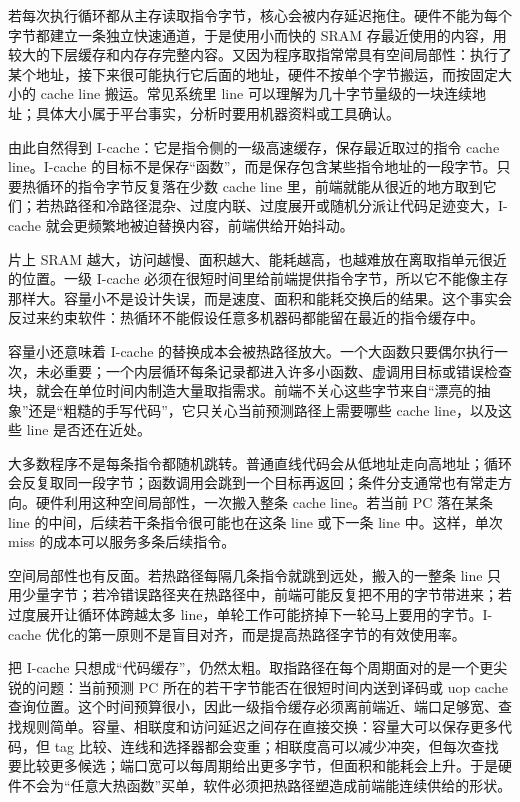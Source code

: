 若每次执行循环都从主存读取指令字节，核心会被内存延迟拖住。硬件不能为每个字节都建立一条独立快速通道，于是使用小而快的 SRAM 存最近使用的内容，用较大的下层缓存和内存存完整内容。又因为程序取指常常具有空间局部性：执行了某个地址，接下来很可能执行它后面的地址，硬件不按单个字节搬运，而按固定大小的 cache line 搬运。常见系统里 line 可以理解为几十字节量级的一块连续地址；具体大小属于平台事实，分析时要用机器资料或工具确认。

由此自然得到 I-cache：它是指令侧的一级高速缓存，保存最近取过的指令 cache line。I-cache 的目标不是保存“函数”，而是保存包含某些指令地址的一段字节。只要热循环的指令字节反复落在少数 cache line 里，前端就能从很近的地方取到它们；若热路径和冷路径混杂、过度内联、过度展开或随机分派让代码足迹变大，I-cache 就会更频繁地被迫替换内容，前端供给开始抖动。

片上 SRAM 越大，访问越慢、面积越大、能耗越高，也越难放在离取指单元很近的位置。一级 I-cache 必须在很短时间里给前端提供指令字节，所以它不能像主存那样大。容量小不是设计失误，而是速度、面积和能耗交换后的结果。这个事实会反过来约束软件：热循环不能假设任意多机器码都能留在最近的指令缓存中。

容量小还意味着 I-cache 的替换成本会被热路径放大。一个大函数只要偶尔执行一次，未必重要；一个内层循环每条记录都进入许多小函数、虚调用目标或错误检查块，就会在单位时间内制造大量取指需求。前端不关心这些字节来自“漂亮的抽象”还是“粗糙的手写代码”，它只关心当前预测路径上需要哪些 cache line，以及这些 line 是否还在近处。

大多数程序不是每条指令都随机跳转。普通直线代码会从低地址走向高地址；循环会反复取同一段字节；函数调用会跳到一个目标再返回；条件分支通常也有常走方向。硬件利用这种空间局部性，一次搬入整条 cache line。若当前 PC 落在某条 line 的中间，后续若干条指令很可能也在这条 line 或下一条 line 中。这样，单次 miss 的成本可以服务多条后续指令。

空间局部性也有反面。若热路径每隔几条指令就跳到远处，搬入的一整条 line 只用少量字节；若冷错误路径夹在热路径中，前端可能反复把不用的字节带进来；若过度展开让循环体跨越太多 line，单轮工作可能挤掉下一轮马上要用的字节。I-cache 优化的第一原则不是盲目对齐，而是提高热路径字节的有效使用率。

把 I-cache 只想成“代码缓存”，仍然太粗。取指路径在每个周期面对的是一个更尖锐的问题：当前预测 PC 所在的若干字节能否在很短时间内送到译码或 uop cache 查询位置。这个时间预算很小，因此一级指令缓存必须离前端近、端口足够宽、查找规则简单。容量、相联度和访问延迟之间存在直接交换：容量大可以保存更多代码，但 tag 比较、连线和选择器都会变重；相联度高可以减少冲突，但每次查找要比较更多候选；端口宽可以每周期给出更多字节，但面积和能耗会上升。于是硬件不会为“任意大热函数”买单，软件必须把热路径塑造成前端能连续供给的形状。

